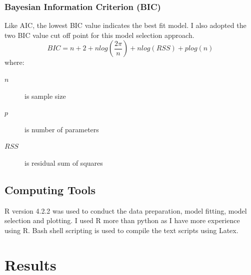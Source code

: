 \documentclass[11pt]{article}
\begin{document}
    \subsubsection{Bayesian Information Criterion (BIC)}
    Like AIC, the lowest BIC value indicates the best fit model. I also adopted the two BIC value cut off point for this model selection approach. 
      \[BIC = n + 2 + nlog(\frac{2 \pi }{n}) +nlog(RSS) + plog(n)\]
    where:
    \begin{description}
    \item[$n$] is sample size
    \item[$p$] is number of parameters
    \item[$RSS$] is residual sum of squares
    \end{description}
    
    \subsection{Computing Tools}
    R version 4.2.2 was used to conduct the data preparation, model fitting, model selection and plotting. I used R more than python as I have more experience using R. Bash shell scripting is used to compile the text scripts using Latex.
    
    \section{Results}	
\end{document}
